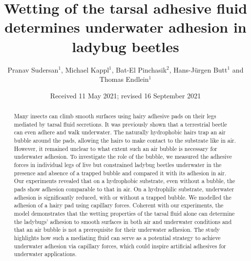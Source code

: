 \documentclass[vruler,JEB]{COB}%
\begin{document}

\title{Wetting of the tarsal adhesive fluid determines underwater adhesion in ladybug beetles}

\author{Pranav Sudersan$^{1}$, Michael Kappl$^{1}$, Bat-El Pinchasik$^{2}$, Hans-J\"{u}rgen Butt$^{1}$ and Thomas Endlein$^{1}$}

\address{
}


\date{Received 11 May 2021; revised 16 September 2021} %

\maketitle

\begin{abstract}
Many insects can climb smooth surfaces using hairy adhesive pads on their legs mediated by tarsal fluid secretions. It was previously shown that a terrestrial beetle can even adhere and walk underwater. The naturally hydrophobic hairs trap an air bubble around the pads, allowing the hairs to make contact to the substrate like in air. However, it remained unclear to what extent such an air bubble is necessary for underwater adhesion. To investigate the role of the bubble, we measured the adhesive forces in individual legs of live but constrained ladybug beetles underwater in the presence and absence of a trapped bubble and compared it with its adhesion in air. Our experiments revealed that on a hydrophobic substrate, even without a bubble, the pads show adhesion comparable to that in air. On a hydrophilic substrate, underwater adhesion is significantly reduced, with or without a trapped bubble. We modelled the adhesion of a hairy pad using capillary forces. Coherent with our experiments, the model demonstrates that the wetting properties of the tarsal fluid alone can determine the ladybugs'  adhesion to smooth surfaces in both air and underwater conditions and that an air bubble is not a prerequisite for their underwater adhesion. The study highlights how such a mediating fluid can serve as a potential strategy to achieve underwater adhesion via capillary forces, which could inspire artificial adhesives for underwater applications.
\end{abstract}
\end{document}
